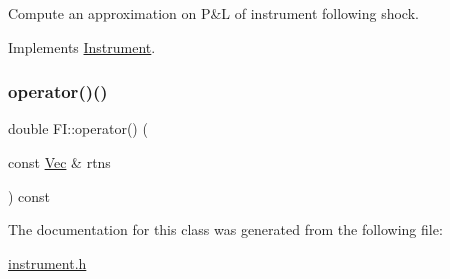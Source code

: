 Compute an approximation on P\&L of instrument following shock. 



Implements \hyperlink{classInstrument_a33b6faccaeb494858dee5c547de897b6}{Instrument}.

\hypertarget{classFI_ab50033a007000c4b4c65a5a5bc08433d}{}\label{classFI_ab50033a007000c4b4c65a5a5bc08433d} 
\subsubsection{\texorpdfstring{operator()()}{operator()()}\hspace{0.1cm}{\footnotesize\ttfamily [2/2]}}
{\footnotesize\ttfamily double F\+I\+::operator() (\begin{DoxyParamCaption}\item[{const \hyperlink{compute__returns__eigen_8h_a1eb6a9306ef406d7975f3cbf2e247777}{Vec} \&}]{rtns }\end{DoxyParamCaption}) const}



The documentation for this class was generated from the following file\+:\begin{DoxyCompactItemize}
\item 
\hyperlink{instrument_8h}{instrument.\+h}\end{DoxyCompactItemize}
